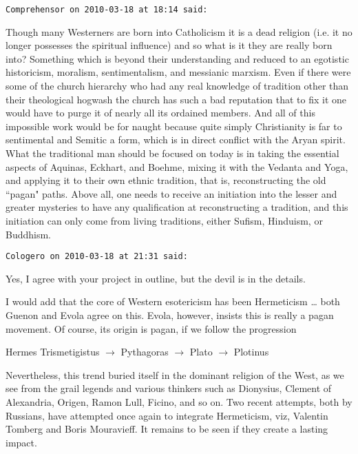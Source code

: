 \begin{footnotesize}\begin{sffamily}



\texttt{Comprehensor on 2010-03-18 at 18:14 said: }

Though many Westerners are born into Catholicism it is a dead religion (i.e. it no longer possesses the spiritual influence) and so what is it they are really born into? Something which is beyond their understanding and reduced to an egotistic historicism, moralism, sentimentalism, and messianic marxism. Even if there were some of the church hierarchy who had any real knowledge of tradition other than their theological hogwash the church has such a bad reputation that to fix it one would have to purge it of nearly all its ordained members. And all of this impossible work would be for naught because quite simply Christianity is far to sentimental and Semitic a form, which is in direct conflict with the Aryan spirit. What the traditional man should be focused on today is in taking the essential aspects of Aquinas, Eckhart, and Boehme, mixing it with the Vedanta and Yoga, and applying it to their own ethnic tradition, that is, reconstructing the old ``pagan" paths. Above all, one needs to receive an initiation into the lesser and greater mysteries to have any qualification at reconstructing a tradition, and this initiation can only come from living traditions, either Sufism, Hinduism, or Buddhism.


\hfill

\texttt{Cologero on 2010-03-18 at 21:31 said: }

Yes, I agree with your project in outline, but the devil is in the details.

I would add that the core of Western esotericism has been Hermeticism … both Guenon and Evola agree on this. Evola, however, insists this is really a pagan movement. Of course, its origin is pagan, if we follow the progression

Hermes Trismetigistus $\rightarrow$ Pythagoras $\rightarrow$ Plato $\rightarrow$ Plotinus

Nevertheless, this trend buried itself in the dominant religion of the West, as we see from the grail legends and various thinkers such as Dionysius, Clement of Alexandria, Origen, Ramon Lull, Ficino, and so on. Two recent attempts, both by Russians, have attempted once again to integrate Hermeticism, viz, Valentin Tomberg and Boris Mouravieff. It remains to be seen if they create a lasting impact.



\end{sffamily}
\end{footnotesize}
